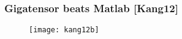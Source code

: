 \begin{frame}[plain]
	\frametitle{Gigatensor beats Matlab [Kang12]}
	\begin{block}{\begin{center}
    \end{center}} 
    \begin{center}
      \begin{figure}[H]
        \centering
        \texttt{[image: kang12b]}
      \end{figure}
    \end{center}
	\end{block} 
\end{frame}

